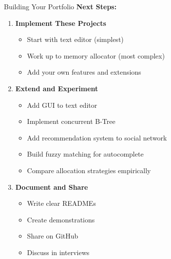 \documentclass[aspectratio=169,xcolor=dvipsnames]{beamer}
\begin{document}
\begin{frame}{Building Your Portfolio}
  \textbf{Next Steps:}
  \begin{enumerate}
    \item \textbf{Implement These Projects}
    \begin{itemize}
      \item Start with text editor (simplest)
      \item Work up to memory allocator (most complex)
      \item Add your own features and extensions
    \end{itemize}

    \vspace{0.2cm}
    \item \textbf{Extend and Experiment}
    \begin{itemize}
      \item Add GUI to text editor
      \item Implement concurrent B-Tree
      \item Add recommendation system to social network
      \item Build fuzzy matching for autocomplete
      \item Compare allocation strategies empirically
    \end{itemize}

    \vspace{0.2cm}
    \item \textbf{Document and Share}
    \begin{itemize}
      \item Write clear READMEs
      \item Create demonstrations
      \item Share on GitHub
      \item Discuss in interviews
    \end{itemize}
  \end{enumerate}
\end{frame}
\end{document}

